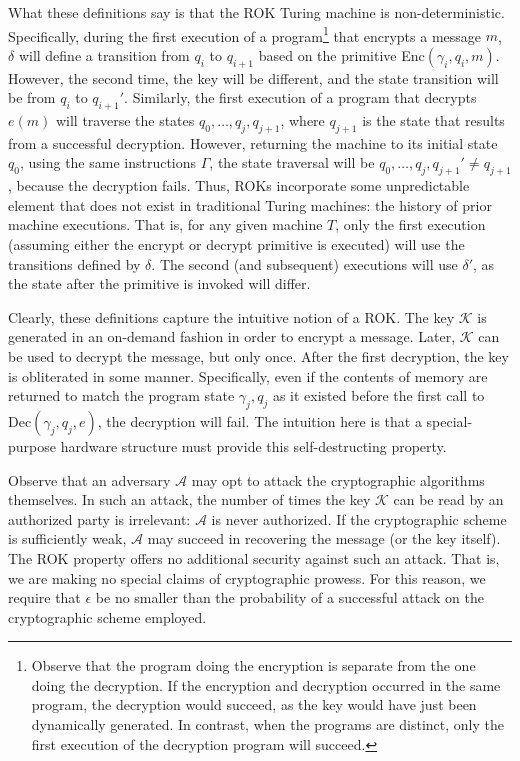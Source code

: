 What these definitions say is that the ROK Turing machine is non-deterministic.  Specifically, during the first execution of
a program\footnote{Observe that the program doing the encryption is separate from the one doing
the decryption.  If the encryption and decryption occurred in the same program, the decryption would succeed, as the key would
have just been dynamically generated.  In contrast, when the programs are distinct, only the first execution of the decryption
program will succeed.} that encrypts a message $m$, $\delta$ will define a transition from $q_i$ to $q_{i+1}$ based on the primitive
{\sf Enc}$(\gamma_i,q_i,m)$.  However, the second time, the key will be different, and the state transition will be from
$q_i$ to $q_{i+1}'$.  Similarly, the first execution of a program that decrypts $e(m)$ will traverse the states
$q_0, \ldots, q_j, q_{j+1}$, where $q_{j+1}$ is the state that results from a successful decryption.  However, returning
the machine to its initial state $q_0$, using the same instructions $\Gamma$, the state traversal will be $q_0, \ldots,
q_j, q_{j+1}' \ne q_{j+1}$, because the decryption fails.  Thus, ROKs incorporate some unpredictable element that does
not exist in traditional Turing machines:  the history of prior machine executions.  That is, for any given machine $T$, only
the first execution (assuming either the encrypt or decrypt primitive is executed) will use the transitions defined by $\delta$.
The second (and subsequent) executions will use $\delta'$, as the state after the primitive is invoked will differ.

Clearly, these definitions capture the intuitive notion of a ROK.  The key $\mathcal{K}$ is generated in an
on-demand fashion in order to encrypt a message.  Later, $\mathcal{K}$ can be used to decrypt the message, but only
once.  After the first decryption, the key is obliterated in some manner.  Specifically, even if the contents of
memory are returned to match the program state $\gamma_j,q_j$ as it existed before the first call to {\sf Dec}$(\gamma_j,q_j,e)$,
the decryption will fail.  The intuition here is that a special-purpose hardware structure must provide this
self-destructing property.

Observe that an adversary $\mathcal{A}$ may opt to attack the cryptographic algorithms themselves.  In such an
attack, the number of times the key $\mathcal{K}$ can be read by an authorized party is irrelevant:  $\mathcal{A}$
is never authorized.  If the cryptographic scheme is sufficiently weak, $\mathcal{A}$ may succeed in recovering
the message (or the key itself).  The ROK property offers no additional security against such an attack.  That
is, we are making no special claims of cryptographic prowess.  For this reason, we require that $\epsilon$ be no
smaller than the probability of a successful attack on the cryptographic scheme employed.

